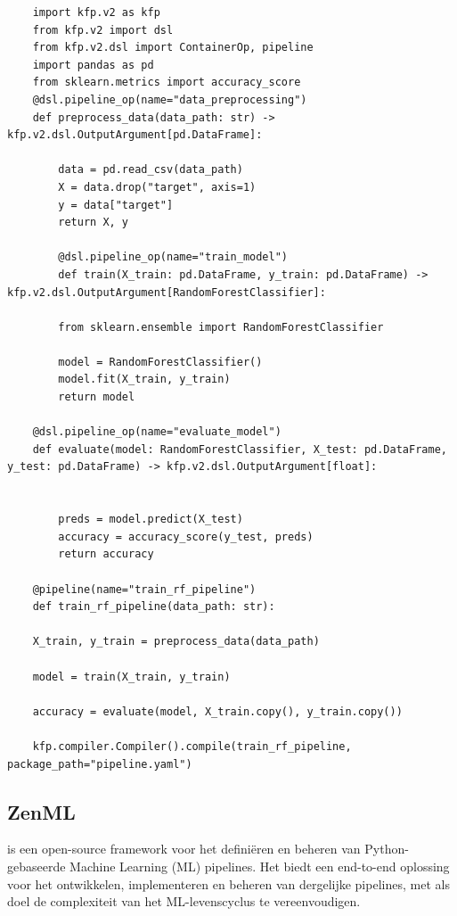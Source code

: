 \begin{verbatim}
    import kfp.v2 as kfp
    from kfp.v2 import dsl
    from kfp.v2.dsl import ContainerOp, pipeline
    import pandas as pd
    from sklearn.metrics import accuracy_score
    @dsl.pipeline_op(name="data_preprocessing")
    def preprocess_data(data_path: str) -> kfp.v2.dsl.OutputArgument[pd.DataFrame]:

        data = pd.read_csv(data_path)
        X = data.drop("target", axis=1)
        y = data["target"]
        return X, y

        @dsl.pipeline_op(name="train_model")
        def train(X_train: pd.DataFrame, y_train: pd.DataFrame) -> kfp.v2.dsl.OutputArgument[RandomForestClassifier]:

        from sklearn.ensemble import RandomForestClassifier

        model = RandomForestClassifier()
        model.fit(X_train, y_train)
        return model

    @dsl.pipeline_op(name="evaluate_model")
    def evaluate(model: RandomForestClassifier, X_test: pd.DataFrame, y_test: pd.DataFrame) -> kfp.v2.dsl.OutputArgument[float]:


        preds = model.predict(X_test)
        accuracy = accuracy_score(y_test, preds)
        return accuracy

    @pipeline(name="train_rf_pipeline")
    def train_rf_pipeline(data_path: str):

    X_train, y_train = preprocess_data(data_path)

    model = train(X_train, y_train)

    accuracy = evaluate(model, X_train.copy(), y_train.copy())

    kfp.compiler.Compiler().compile(train_rf_pipeline, package_path="pipeline.yaml")
\end{verbatim}

\subsection{ZenML}

\textcite{ZenML2024} is een open-source framework voor het definiëren en beheren van Python-gebaseerde Machine Learning (ML) pipelines. Het biedt een end-to-end oplossing voor het ontwikkelen, implementeren en beheren van dergelijke pipelines, met als doel de complexiteit van het ML-levenscyclus te vereenvoudigen.

